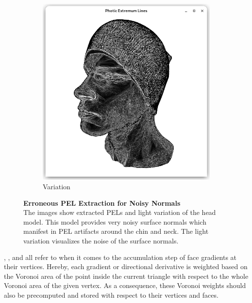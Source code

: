 \documentclass[9pt,fleqn,twoside,twocolumn]{stdglobal}
\begin{document}
\begin{figure}[t]
\begin{subfigure}[b]{0.49\linewidth}
        \includegraphics[width=\textwidth,trim={15px 15 15 50},clip]{images/head-light-variation.png}
        \caption{Variation}
      \end{subfigure}
      \caption{%
        \textbf{Erroneous PEL Extraction for Noisy Normals}\\
        The images show extracted PELs and light variation of the head model.
        This model provides very noisy surface normals which manifest in PEL artifacts around the chin and neck.
        The light variation visualizes the noise of the surface normals.
      }
      \label{fig:preprocessing-normals-noise}
    \end{figure}


    \textcite{rusinkiewicz2004}, \textcite{xie2007}, and \textcite{zhang2010} all refer to \textcite{meyer2001} when it comes to the accumulation step of face gradients at their vertices.
    Hereby, each gradient or directional derivative is weighted based on the Voronoi area of the point inside the current triangle with respect to the whole Voronoi area of the given vertex.
    As a consequence, these Voronoi weights should also be precomputed and stored with respect to their vertices and faces.
\end{document}
